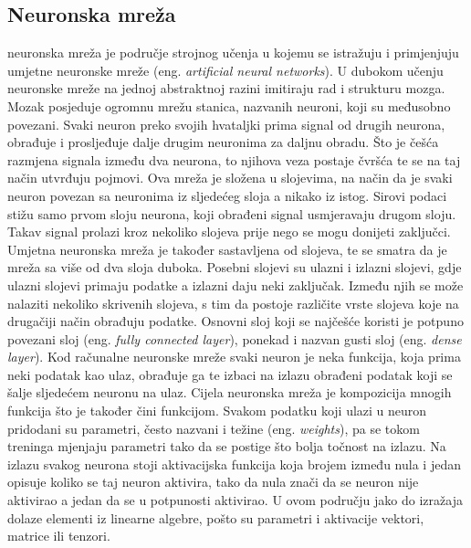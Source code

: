 \subsection{Neuronska mreža}
neuronska mreža je područje strojnog učenja u kojemu se istražuju i primjenjuju umjetne neuronske mreže (eng. \textit{artificial neural networks}). U dubokom učenju neuronske mreže na jednoj abstraktnoj razini imitiraju rad i strukturu mozga. Mozak posjeduje ogromnu mrežu stanica, nazvanih neuroni, koji su međusobno povezani. Svaki neuron preko svojih hvataljki prima signal od drugih neurona, obrađuje i prosljeđuje dalje drugim neuronima za daljnu obradu. Što je češća razmjena signala između dva neurona, to njihova veza postaje čvršća te se na taj način utvrđuju pojmovi. Ova mreža je složena u slojevima, na način da je svaki neuron povezan sa neuronima iz sljedećeg sloja a nikako iz istog. Sirovi podaci stižu samo prvom sloju neurona, koji obrađeni signal usmjeravaju drugom sloju. Takav signal prolazi kroz nekoliko slojeva prije nego se mogu donijeti zaključci. Umjetna neuronska mreža je također sastavljena od slojeva, te se smatra da je mreža sa više od dva sloja duboka. Posebni slojevi su ulazni i izlazni slojevi, gdje ulazni slojevi primaju podatke a izlazni daju neki zaključak. Između njih se može nalaziti nekoliko skrivenih slojeva, s tim da postoje različite vrste slojeva koje na drugačiji način obrađuju podatke. Osnovni sloj koji se najčešće koristi je potpuno povezani sloj (eng. \textit{fully connected layer}), ponekad i nazvan gusti sloj (eng. \textit{dense layer}). Kod računalne neuronske mreže svaki neuron je neka funkcija, koja prima neki podatak kao ulaz, obrađuje ga te izbaci na izlazu obrađeni podatak koji se šalje sljedećem neuronu na ulaz. Cijela neuronska mreža je kompozicija mnogih funkcija što je također čini funkcijom. Svakom podatku koji ulazi u neuron pridodani su parametri, često nazvani i težine (eng. \textit{weights}), pa se tokom treninga mjenjaju parametri tako da se postige što bolja točnost na izlazu. Na izlazu svakog neurona stoji aktivacijska funkcija koja brojem između nula i jedan opisuje koliko se taj neuron aktivira, tako da nula znači da se neuron nije aktivirao a jedan da se u potpunosti aktivirao. U ovom području jako do izražaja dolaze elementi iz linearne algebre, pošto su parametri i aktivacije vektori, matrice ili tenzori. 

